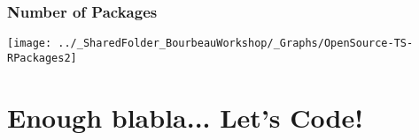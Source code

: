 \documentclass{beamer}
\begin{document}
    \begin{frame}
        \frametitle{Number of \R Packages}  \vspace{1.2cm}
        \begin{center}
            \texttt{[image: ../\_SharedFolder\_BourbeauWorkshop/\_Graphs/OpenSource-TS-RPackages2]}
        \end{center} 
    \end{frame}
   
\section{Enough blabla... Let's Code!} 
  
% 
% 
%     
%   
% 
%   
%     
%     
%     
\end{document}
